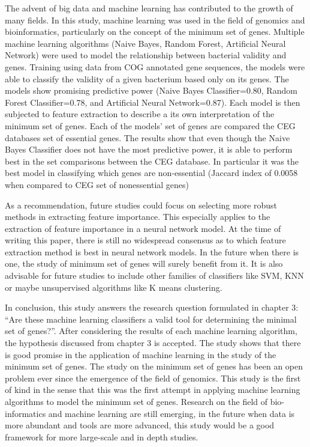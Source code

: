 \documentclass[]{report}
\begin{document}
The advent of big data and machine learning has contributed to the
growth of many fields. In this study, machine learning was used in the
field of genomics and bioinformatics, particularly on the concept of the
minimum set of genes. Multiple machine learning algorithms (Naive Bayes,
Random Forest, Artificial Neural Network) were used to model the
relationship between bacterial validity and genes. Training using data
from COG annotated gene sequences, the models were able to classify the
validity of a given bacterium based only on its genes. The models show
promising predictive power (Naive Bayes Classifier=0.80, Random Forest
Classifier=0.78, and Artificial Neural Network=0.87). Each model is then
subjected to feature extraction to describe a its own interpretation of
the minimum set of genes. Each of the models' set of genes are compared
the CEG databases set of essential genes. The results show that even
though the Naive Bayes Classifier does not have the most predictive
power, it is able to perform best in the set comparisons between the CEG
database. In particular it was the best model in classifying which genes
are non-essential (Jaccard index of 0.0058 when compared to CEG set of
nonessential genes)

As a recommendation, future studies could focus on selecting more robust
methods in extracting feature importance. This especially applies to the
extraction of feature importance in a neural network model. At the time
of writing this paper, there is still no widespread consensus as to
which feature extraction method is best in neural network models. In the
future when there is one, the study of minimum set of genes will surely
benefit from it. It is also advisable for future studies to include
other families of classifiers like SVM, KNN or maybe unsupervised
algorithms like K means clustering.

In conclusion, this study answers the research question formulated in
chapter 3: ``Are these machine learning classifiers a valid tool for
determining the minimal set of genes?''. After considering the results
of each machine learning algorithm, the hypothesis discussed from
chapter 3 is accepted. The study shows that there is good promise in the
application of machine learning in the study of the minimum set of
genes. The study on the minimum set of genes has been an open problem
ever since the emergence of the field of genomics. This study is the
first of kind in the sense that this was the first attempt in applying
machine learning algorithms to model the minimum set of genes. Research
on the field of bio-informatics and machine learning are still emerging,
in the future when data is more abundant and tools are more advanced,
this study would be a good framework for more large-scale and in depth
studies.
\end{document}
